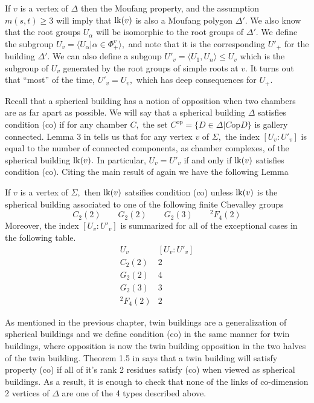 \documentclass[class=book, crop=false,12 pt]{standalone}
\begin{document}
If $v$ is a vertex of $\Delta$ then the Moufang property, and the assumption $m(s,t)\ge 3$ will imply that $\mathrm{lk}(v)$ is also a Moufang polygon $\Delta'.$ We also know that the root groups $U_\alpha$ will be isomorphic to the root groups of $\Delta'.$ We define the subgroup $U_v=\langle U_\alpha|\alpha\in \Phi_+^v\rangle,$ and note that it is the corresponding $U'_+$ for the building $\Delta'.$ We can also define a subgoup $U'_v=\langle U_1,U_n\rangle\le U_v$ which is the subgroup of $U_v$ generated by the root groups of simple roots at $v.$ It turns out that ``most'' of the time, $U'_v=U_v,$ which has deep consequences for $U_+.$

Recall that a spherical building has a notion of opposition when two chambers are as far apart as possible. We will say that a spherical building $\Delta$ satisfies condition (co) if for any chamber $C,$ the set $C^\text{op}=\{D\in \Delta|C\mathrm{ op }D\}$ is gallery connected. Lemma 3 in \cite{cop} tells us that for any vertex $v$ of $\Sigma,$ the index $[U_v:U'_v]$ is equal to the number of connected components, as chamber complexes, of the spherical building $\mathrm{lk}(v).$ In particular, $U_v=U'_v$ if and only if $\mathrm{lk}(v)$ satisfies condition (co). Citing the main result of \cite{cop} again we have the following Lemma

\begin{lemma}
	\label{lem:index}
	If $v$ is a vertex of $\Sigma,$ then $\mathrm{lk}(v)$ satsifies condition (co) unless $\mathrm{lk}(v)$ is the spherical building associated to one of the following finite Chevalley groups
	\[
		C_2(2)\qquad G_2(2) \qquad G_2(3) \qquad {}^2F_4(2)
	\]
	Moreover, the index $[U_v:U'_v]$ is summarized for all of the exceptional cases in the following table.
	\[
		\begin{array}{c|c}
			U_v&[U_v:U'_v]\\\hline
			C_2(2)&2\\
			G_2(2)&4\\
			G_2(3)&3\\
			{}^2F_4(2)&2
		\end{array}
	\]
\end{lemma}

As mentioned in the previous chapter, twin buildings are a generalization of spherical buildings and we define condition (co) in the same manner for twin buildings, where opposition is now the twin building opposition in the two halves of the twin building. Theorem 1.5 in \cite{globalco} says that a twin building will satisfy property (co) if all of it's rank 2 residues satisfy (co) when viewed as spherical buildings. As a result, it is enough to check that none of the links of co-dimension 2 vertices of $\Delta$ are one of the 4 types described above.
\end{document}
